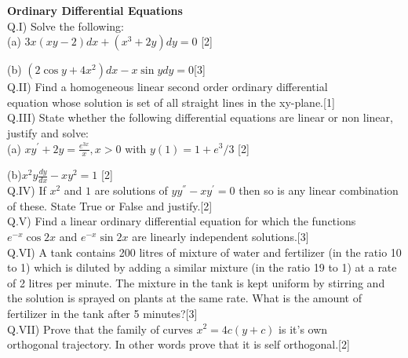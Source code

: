 \documentclass[11pt]{article}
\begin{document}
\textbf{Ordinary Differential Equations}\\

Q.I) Solve the following:\\
	
(a) $3x(xy-2)dx+(x^3+2y)dy=0$ \hspace{7cm}[2]

(b) $(2\cos{y}+4x^2)dx-x\sin{y}dy=0$\hspace{6.85cm}[3]\\ 

Q.II) Find a homogeneous linear second order ordinary differential \\  equation whose solution is set of all straight lines in the xy-plane.\hspace{2.5cm}[1]\\

Q.III) State whether the following differential equations are linear or non linear, justify and solve:\\

(a) $xy^{'}+2y=\frac{e^{3x}}{x} , x>0$ with $y(1)=1+e^3/3$ \hspace{5cm}[2]

(b)$x^2y\frac{dy}{dx}-xy^2=1$ \hspace{9.2cm}[2]\\

Q.IV) If $x^2$ and $1$ are solutions of $yy^{''}-xy^{'}=0$ then so is any linear combination of these. State True or False and justify.\hspace{5cm}[2]\\

Q.V) Find a linear ordinary differential equation for which the functions $e^{-x}\cos{2x}$ and $e^{-x}\sin{2x}$ are linearly independent solutions.\hspace{3.2cm}[3]\\

Q.VI) A tank contains 200 litres of mixture of water and fertilizer (in the ratio 10 to 1) which is diluted by adding a similar mixture (in the ratio 19 to 1) at a rate of 2 litres per minute. The mixture in the tank is kept uniform by stirring and the solution is sprayed on plants at the same rate. What is the amount of fertilizer in the tank after 5 minutes?\hspace{4.45cm}[3]\\

Q.VII) Prove that the family of curves $x^2=4c(y+c)$ is it's own \\orthogonal trajectory. In other words prove that it is self orthogonal.\hspace{1.8cm}[2]
\end{document}
